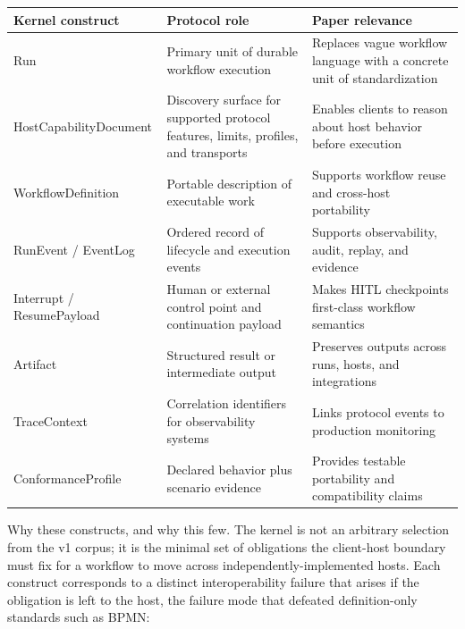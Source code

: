\documentclass[11pt]{article}
\begin{document}
\begin{table}[H]\centering\footnotesize
\begin{tabular}{>{\raggedright\arraybackslash}p{}>{\raggedright\arraybackslash}p{}>{\raggedright\arraybackslash}p{}}\hline
\textbf{Kernel construct} & \textbf{Protocol role} & \textbf{Paper relevance} \\\hline
Run & Primary unit of durable workflow execution & Replaces vague workflow language with a concrete unit of standardization \\\hline
HostCapabilityDocument & Discovery surface for supported protocol features, limits, profiles, and transports & Enables clients to reason about host behavior before execution \\\hline
WorkflowDefinition & Portable description of executable work & Supports workflow reuse and cross-host portability \\\hline
RunEvent / EventLog & Ordered record of lifecycle and execution events & Supports observability, audit, replay, and evidence \\\hline
Interrupt / ResumePayload & Human or external control point and continuation payload & Makes HITL checkpoints first-class workflow semantics \\\hline
Artifact & Structured result or intermediate output & Preserves outputs across runs, hosts, and integrations \\\hline
TraceContext & Correlation identifiers for observability systems & Links protocol events to production monitoring \\\hline
ConformanceProfile & Declared behavior plus scenario evidence & Provides testable portability and compatibility claims \\\hline
\end{tabular}\end{table}
Why these constructs, and why this few. The kernel is not an arbitrary selection from the v1 corpus; it is the minimal set of obligations the client-host boundary must fix for a workflow to move across independently-implemented hosts. Each construct corresponds to a distinct interoperability failure that arises if the obligation is left to the host, the failure mode that defeated definition-only standards such as BPMN:
\end{document}
